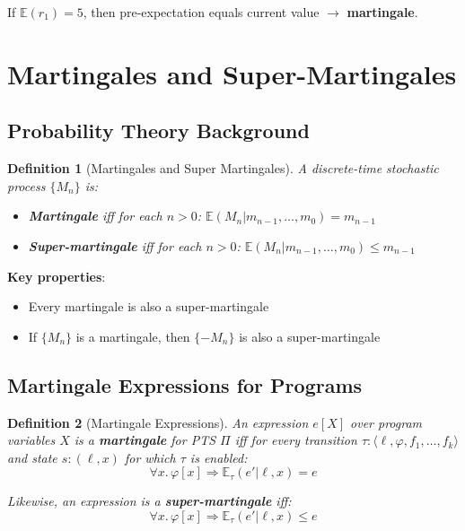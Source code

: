 \documentclass{article}
\newtheorem{definition}{Definition}
\begin{document}
If $\mathbb{E}(r_1) = 5$, then pre-expectation equals current value $\to$ \textbf{martingale}.

\section{Martingales and Super-Martingales}

\subsection{Probability Theory Background}

\begin{definition}[Martingales and Super Martingales]
A discrete-time stochastic process $\{M_n\}$ is:
\begin{itemize}
    \item \textbf{Martingale} iff for each $n > 0$: $\mathbb{E}(M_n | m_{n-1}, \ldots, m_0) = m_{n-1}$

    \item \textbf{Super-martingale} iff for each $n > 0$: $\mathbb{E}(M_n | m_{n-1}, \ldots, m_0) \leq m_{n-1}$
\end{itemize}
\end{definition}

\textbf{Key properties}:
\begin{itemize}
    \item Every martingale is also a super-martingale
    \item If $\{M_n\}$ is a martingale, then $\{-M_n\}$ is also a super-martingale
\end{itemize}

\subsection{Martingale Expressions for Programs}

\begin{definition}[Martingale Expressions]
An expression $e[X]$ over program variables $X$ is a \textbf{martingale} for PTS $\Pi$ iff for every transition $\tau: \langle \ell, \varphi, f_1, \ldots, f_k \rangle$ and state $s: (\ell, x)$ for which $\tau$ is enabled:
\begin{equation}
\forall x. \, \varphi[x] \Rightarrow \mathbb{E}_\tau(e' | \ell, x) = e
\end{equation}

Likewise, an expression is a \textbf{super-martingale} iff:
\begin{equation}
\forall x. \, \varphi[x] \Rightarrow \mathbb{E}_\tau(e' | \ell, x) \leq e
\end{equation}
\end{definition}
\end{document}

